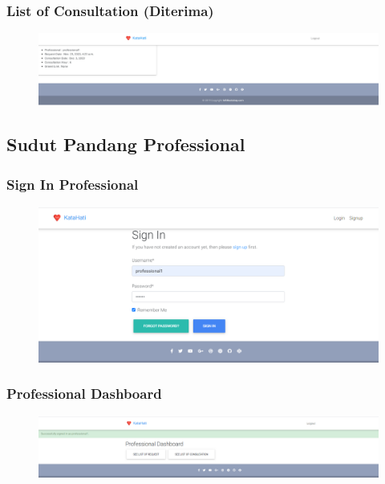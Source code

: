 \documentclass{article}
\begin{document}
	\subsubsection{List of Consultation (Diterima)}
	\begin{figure}[H]
		\centering
		\includegraphics[width=480px]{Consultation.png}
	\end{figure}

	\subsection{Sudut Pandang Professional}
	\subsubsection{Sign In Professional}
	\begin{figure}[H]
		\centering
		\includegraphics[width=480px]{Sign In Prof.png}
	\end{figure}

	\subsubsection{Professional Dashboard}
	\begin{figure}[H]
		\centering
		\includegraphics[width=480px]{Prof Dash.png}
	\end{figure}
\end{document}
